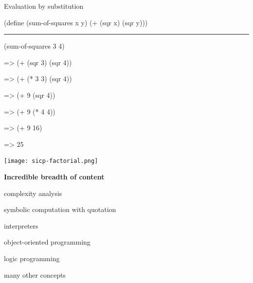 \documentclass[UKenglish,usenames,dvipsnames,svgnames,table,aspectratio=169,mathserif]{beamer}
\newcommand{\nl}{\vspace{\baselineskip}}
\newcommand{\pnl}{\pause \nl}
\begin{document}
\begin{frame}[fragile]
Evaluation by substitution

\begin{schemecode}
(define (sum-of-squares x y)
  (+ (sqr x) (sqr y)))
\end{schemecode}

\nl
\hrule
\pnl

\begin{schemecode}
     (sum-of-squares 3 4)
\end{schemecode}
\pause
\begin{schemecode}
=>   (+ (sqr 3) (sqr 4))
\end{schemecode}
\pause
\begin{schemecode}
=>   (+ (* 3 3) (sqr 4))
\end{schemecode}
\pause
\begin{schemecode}
=>   (+ 9 (sqr 4))
\end{schemecode}
\pause
\begin{schemecode}
=>   (+ 9 (* 4 4))
\end{schemecode}
\pause
\begin{schemecode}
=>   (+ 9 16)
\end{schemecode}
\pause
\begin{schemecode}
=>   25
\end{schemecode}
\end{frame}


\begin{frame}
\centering
\texttt{[image: sicp-factorial.png]}
\end{frame}


\begin{frame}

\begin{center}
{\bf Incredible breadth of content}
\end{center}
\begin{center} complexity analysis \end{center}
\begin{center} symbolic computation with quotation \end{center}
\begin{center} interpreters \end{center}
\begin{center} object-oriented programming \end{center}
\begin{center} logic programming \end{center}
\begin{center} many other concepts \end{center}
\end{frame}
\end{document}
